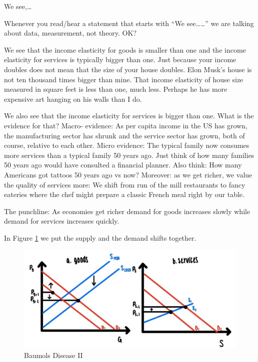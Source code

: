 \documentclass[
]{book}
\begin{document}
We see,\ldots{}

Whenever you read/hear a statement that starts with ``We see\ldots\ldots{}'' we are talking about data, measurement, not theory. OK?

We see that the income elasticity for goods is smaller than one and the income elasticity for services is typically bigger than one. Just because your income doubles does not mean that the size of your house doubles. Elon Musk's house is not ten thousand times bigger than mine. That income elasticity of house size measured in square feet is less than one, much less. Perhaps he has more expensive art hanging on his walls than I do.

We also see that the income elasticity for services is bigger than one. What is the evidence for that? Macro- evidence: As per capita income in the US has grown, the manufacturing sector has shrunk and the service sector has grown, both of course, relative to each other. Micro evidence: The typical family now consumes more services than a typical family 50 years ago. Just think of how many families 50 years ago would have consulted a financial planner. Also think: How many Americans got tattoos 50 years ago vs now? Moreover: as we get richer, we value the quality of services more: We shift from run of the mill restaurants to fancy eateries where the chef might prepare a classic French meal right by our table.

The punchline: As economies get richer demand for goods increases slowly while demand for services increases quickly.

In Figure \ref{fig:compmarkets13} we put the supply and the demand shifts together.

\begin{figure}

{\centering \includegraphics[width=1\linewidth]{img/compmarkets/fig13} 

}

\caption{Baumols Disease II}\label{fig:compmarkets13}
\end{figure}
\end{document}
